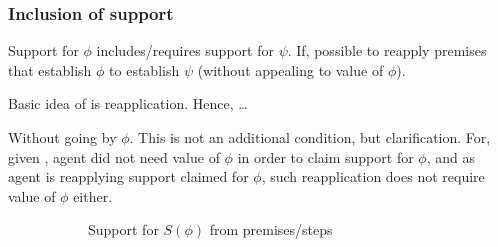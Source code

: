 \subsubsection{Inclusion of support}
\label{sec:inclusion-support}

\begin{note}
  \begin{proposition}
    Support for \(\phi\) includes/requires support for \(\psi\).
    If, possible to reapply premises that establish \(\phi\) to establish \(\psi\) (without appealing to value of \(\phi\)).
  \end{proposition}
  Basic idea of \incl{} is reapplication.
  Hence, \incl{}\dots

  Without going by \(\phi\).
  This is not an additional condition, but clarification.
  For, given \eiS{}, agent did not need value of \(\phi\) in order to claim support for \(\phi\), and as agent is reapplying support claimed for \(\phi\), such reapplication does not require value of \(\phi\) either.

    \begin{figure}[H]
    \begin{subfigure}{.45\textwidth}
      \centering
      \caption{Support for \(S(\phi)\) from premises/steps}
    \end{subfigure}
    \hfill
    \begin{subfigure}{.45\textwidth}
      \centering
\end{subfigure}
\end{figure}
\end{note}

